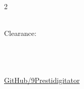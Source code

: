 \begin{center}
  \begin{multicols}{2}
    \begin{flushleft}
      {\LARGE \textbf{}}\\
      \small Clearance: \textbf{}\\
      \small {}\\
    \end{flushleft}
    \columnbreak
    \begin{flushright}
      \emailentry\\
      \small {}\\
      \small \href{https://github.com/9Prestidigitator}{GitHub/9Prestidigitator}\\
    \end{flushright}
  \end{multicols}
\end{center}
